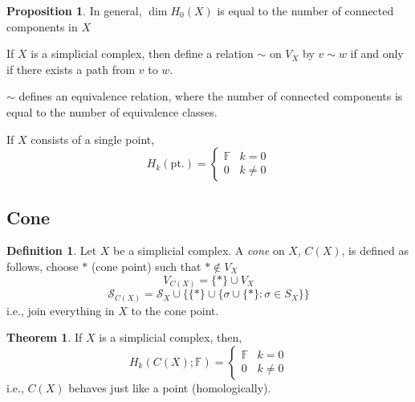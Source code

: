 \documentclass[a4paper,14pt]{extarticle}
\theoremstyle{definition}
\newtheorem*{theorem}{Theorem}
\newtheorem*{definition}{Definition}
\newtheorem*{proposition}{Proposition}
\begin{document}
\begin{proposition}
	In general, $\dim H_0(X)$ is equal to the number of connected components in $X$
\end{proposition}

If $X$ is a simplicial complex, then define a relation $\sim$ on $V_X$ by $v\sim w$ if and
only if there exists a path from $v$ to $w$.

\vspace{12pt}

$\sim$ defines an equivalence relation, where the number of connected components is equal
to the number of equivalence classes.

If $X$ consists of a single point,
\[H_k(\text{pt.})=\begin{cases}\mathbb{F}&k=0\\0&k\neq0\end{cases}\]

\subsection{Cone}
\begin{definition}
	Let $X$ be a simplicial complex. A \emph{cone} on $X$, $C(X)$, is defined as follows,
	choose $*$ (cone point) such that $*\not\in V_X$
	\[V_{C(X)}=\{*\}\cup V_X\] \[\mathcal{S}_{C(X)}=
	\mathcal{S}_X\cup\{\{*\}\cup\{\sigma\cup\{*\}:\sigma\in S_X\}\}\]
	i.e., join everything in $X$ to the cone point.
\end{definition}

\begin{theorem}
	If $X$ is a simplicial complex, then,
	\[H_k(C(X);\mathbb{F})=\begin{cases}\mathbb{F}&k=0\\0&k\neq0\end{cases}\]
	i.e., $C(X)$ behaves just like a point (homologically).
\end{theorem}
\end{document}
